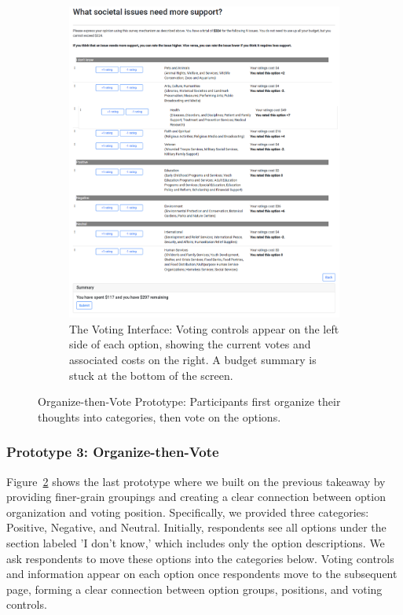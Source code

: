 \begin{figure}[h]
\begin{subfigure}[b]{0.48\textwidth}
        \includegraphics[width=\textwidth]{content/image/prototypes/4.2_grouping_vote.png}
        \caption{The Voting Interface: Voting controls appear on the left side of each option, showing the current votes and associated costs on the right. A budget summary is stuck at the bottom of the screen.}
        \label{fig:qv_org_p2}
    \end{subfigure}
    \caption{Organize-then-Vote Prototype: Participants first organize their thoughts into categories, then vote on the options.}
    \label{fig:qv_org}
\end{figure}

\subsubsection{Prototype 3: Organize-then-Vote}
Figure~\ref{fig:qv_org} shows the last prototype where we built on the previous takeaway by providing finer-grain groupings and creating a clear connection between option organization and voting position. Specifically, we provided three categories: Positive, Negative, and Neutral. Initially, respondents see all options under the section labeled 'I don't know,' which includes only the option descriptions. We ask respondents to move these options into the categories below. Voting controls and information appear on each option once respondents move to the subsequent page, forming a clear connection between option groups, positions, and voting controls.

